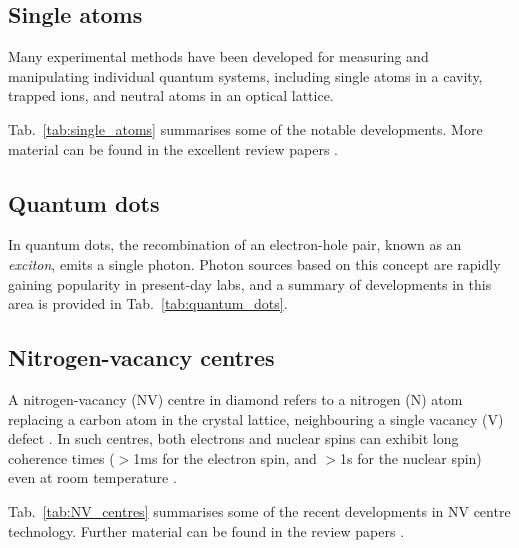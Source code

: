 %
%

\subsection{Single atoms} 

Many experimental methods have been developed for measuring and manipulating individual quantum systems, including single atoms in a cavity, trapped ions, and neutral atoms in an optical lattice. 

Tab.~\ref{tab:single_atoms} summarises some of the notable developments. More material can be found in the excellent review papers \cite{bib:blatt2008entangled, bib:haroche2006exploring, bib:leibfried2003quantum}.

%
%

\subsection{Quantum dots} 

In quantum dots, the recombination of an electron-hole pair, known as an \textit{exciton}, emits a single photon. Photon sources based on this concept are rapidly gaining popularity in present-day labs, and a summary of developments in this area is provided in Tab.~\ref{tab:quantum_dots}.

%
%

\subsection{Nitrogen-vacancy centres} 

A nitrogen-vacancy (NV) centre in diamond refers to a nitrogen (N) atom replacing a carbon atom in the crystal lattice, neighbouring a single vacancy (V) defect \cite{bib:doherty2013nitrogen}. In such centres, both electrons and nuclear spins can exhibit long coherence times ($>$1ms for the electron spin, and $>$1s for the nuclear spin) even at room temperature \cite{bib:balasubramanian2009ultralong, bib:neumann2010quantum, bib:maurer2012room}.

Tab.~\ref{tab:NV_centres} summarises some of the recent developments in NV centre technology. Further material can be found in the review papers \cite{bib:doherty2013nitrogen, bib:atature2018material, bib:awschalom2018quantum}.

